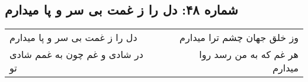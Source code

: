 \begin{center}
\section*{شماره ۴۸: دل را ز غمت بی سر و پا میدارم}
\label{sec:048}
\begin{longtable}{l p{0.5cm} r}
دل را ز غمت بی سر و پا میدارم
&&
وز خلق جهان چشم ترا میدارم
\\
در شادی و غم چون به غمم شادی تو
&&
هر غم که به من رسد روا میدارم
\\
\end{longtable}
\end{center}
